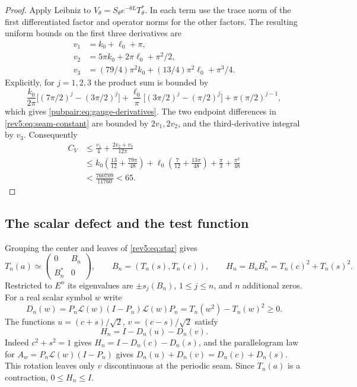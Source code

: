 \begin{proof}
Apply Leibniz to $V_\theta=S_\theta e^{-\theta L}T_\theta^*$.
In each term use the trace norm of the first differentiated factor
and operator norms for the other factors.  The resulting uniform
bounds on the first three derivatives are
\begin{equation}\label{pubpair:eq:gauge-derivatives}
 \begin{aligned}
 v_1&=k_0+\ell_0+\pi,\\
 v_2&=5\pi k_0+2\pi\ell_0+\pi^2/2,\\
 v_3&=(79/4)\pi^2k_0+(13/4)\pi^2\ell_0+\pi^3/4.
 \end{aligned}
\end{equation}
Explicitly, for $j=1,2,3$ the product sum is bounded by
\[
 \frac{k_0}{2\pi}\big[(7\pi/2)^j-(3\pi/2)^j\big]
 +\frac{\ell_0}{\pi}\big[(3\pi/2)^j-(\pi/2)^j\big]
 +\pi(\pi/2)^{j-1},
\]
which gives \eqref{pubpair:eq:gauge-derivatives}.
The two endpoint differences in
\eqref{rev5:eq:seam-constant} are bounded by $2v_1,2v_2$,
and the third-derivative integral by $v_3$.  Consequently
\[
 \begin{split}
 C_V&\le\frac{v_1}{4}+\frac{2v_2+v_3}{12\pi}\\
 &\le k_0\left(\frac{13}{12}+\frac{79\pi}{48}\right)
    +\ell_0\left(\frac7{12}+\frac{13\pi}{48}\right)
    +\frac{\pi}{3}+\frac{\pi^2}{48}\\
 &<\frac{760709}{11760}<65.
 \end{split}
\]
\end{proof}

\subsection{The scalar defect and the test function}
\label{rev5:subsec:scalar-defect}

Grouping the center and leaves of \eqref{rev5:eq:star} gives
\[
 T_n(a)\simeq\begin{pmatrix}0&B_n\\B_n^*&0\end{pmatrix},
 \qquad B_n=(T_n(s),T_n(c)),\qquad
 H_n=B_nB_n^*=T_n(c)^2+T_n(s)^2.
\]
Restricted to $E^n$ its eigenvalues are $\pm s_j(B_n)$, $1\leq j\leq n$, and $n$
additional zeros.  For a real scalar symbol $w$ write
\[
 D_n(w)=P_n\mathcal L(w)(I-P_n)\mathcal L(w)P_n
        =T_n(w^2)-T_n(w)^2\geq0.
\]
The functions $u=(c+s)/\sqrt2$, $v=(c-s)/\sqrt2$ satisfy
\begin{equation}\label{rev5:eq:scalar-defect}
 H_n=I-D_n(u)-D_n(v).
\end{equation}
Indeed $c^2+s^2=1$ gives $H_n=I-D_n(c)-D_n(s)$, and the
parallelogram law for $A_w=P_n\mathcal L(w)(I-P_n)$ gives
$D_n(u)+D_n(v)=D_n(c)+D_n(s)$. This rotation leaves only $v$
discontinuous at the periodic seam. Since $T_n(a)$ is a contraction,
$0\le H_n\le I$.

